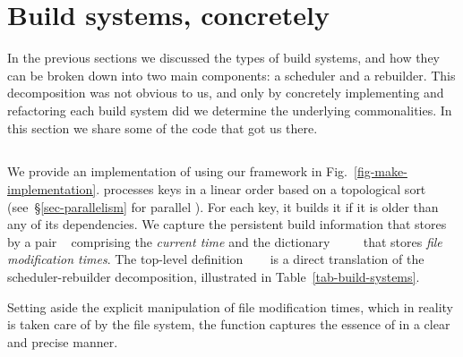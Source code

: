 \section{Build systems, concretely}\label{sec-implementations}

In the previous sections we discussed the types of build systems, and how they
can be broken down into two main components: a scheduler and a rebuilder. This
decomposition was not obvious to us, and only by concretely implementing and
refactoring each build system did we determine the underlying commonalities.
In this section we share some of the code that got us there.

\subsection{\Make}\label{sec-implementation-make}

We provide an implementation of \Make using our framework in
Fig.~\ref{fig-make-implementation}. \Make processes keys in a linear order based
on a topological sort (see~\S\ref{sec-parallelism} for parallel \Make). For
each key, it builds it if it is older than any of its dependencies. We capture
the persistent build information that \Make stores by a pair
~ comprising the \emph{current time}  and the
dictionary ~\hs{::}~~~ that stores \emph{file
modification times}. The top-level definition
~\hs{=}~~ is a direct translation
of the scheduler-rebuilder decomposition, illustrated in Table~\ref{tab-build-systems}.

Setting aside the explicit manipulation of file modification times, which in
reality is taken care of by the file system, the function  captures
the essence of \Make in a clear and precise manner.

